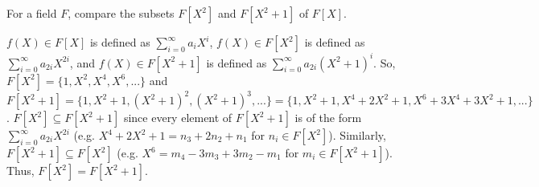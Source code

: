 \begin{ProbBox} %
\begin{problem}[Golan 142]
For a field $F$, compare the subsets $F[X^2]$ and $F[X^2+1]$ of $F[X]$.
\end{problem}
\smallskip
\begin{solution}
$f(X) \in F[X]$ is defined as $\sum\limits_{i=0}^\infty a_{i}X^{i}$, $f(X) \in F[X^2]$ is defined as $\sum\limits_{i=0}^\infty a_{2i}X^{2i}$, and $f(X) \in F[X^2+1]$ is defined as $\sum\limits_{i=0}^\infty a_{2i}(X^{2}+1)^i$. So, $F[X^2]=\{1,X^2,X^4,X^6,...\}$ and $F[X^2+1]=\{1,X^2+1,(X^2+1)^2,(X^2+1)^3,...\} = \{1,X^2+1,X^4+2X^2+1,X^6+3X^4+3X^2+1,...\}$. $F[X^2] \subseteq F[X^2+1]$ since every element of $F[X^2+1]$ is of the form $\sum\limits_{i=0}^\infty a_{2i}X^{2i}$ (e.g. $X^4+2X^2+1 = n_3+2n_2+n_1$ for $n_i \in F[X^2]$). Similarly, $F[X^2+1] \subseteq F[X^2]$ (e.g. $X^6=m_4-3m_3+3m_2-m_1$ for $m_i \in F[X^2+1]$). Thus, $F[X^2]=F[X^2+1]$.
\end{solution}
\end{ProbBox}
\probskip

